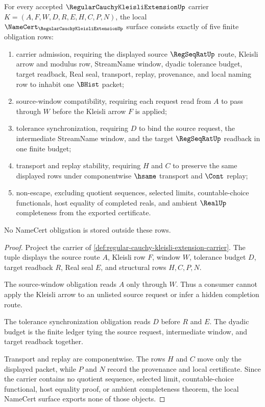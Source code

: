 \begin{theorem}
\label{thm:regular-cauchy-kleisli-extension-namecert-obligations}
For every accepted $\RegularCauchyKleisliExtensionUp$ carrier $K=(A,F,W,D,R,E,H,C,P,N)$, the local $\NameCert_{\RegularCauchyKleisliExtensionUp}$ surface consists exactly of five finite obligation rows:
\begin{enumerate}
\item carrier admission, requiring the displayed source $\RegSeqRatUp$ route, Kleisli arrow and modulus row, StreamName window, dyadic tolerance budget, target readback, Real seal, transport, replay, provenance, and local naming row to inhabit one $\BHist$ packet;
\item source-window compatibility, requiring each request read from $A$ to pass through $W$ before the Kleisli arrow $F$ is applied;
\item tolerance synchronization, requiring $D$ to bind the source request, the intermediate StreamName window, and the target $\RegSeqRatUp$ readback in one finite budget;
\item transport and replay stability, requiring $H$ and $C$ to preserve the same displayed rows under componentwise $\hsame$ transport and $\Cont$ replay;
\item non-escape, excluding quotient sequences, selected limits, countable-choice functionals, host equality of completed reals, and ambient $\RealUp$ completeness from the exported certificate.
\end{enumerate}
No NameCert obligation is stored outside these rows.
\end{theorem}
\begin{proof}
Project the carrier of \autoref{def:regular-cauchy-kleisli-extension-carrier}. The tuple displays the source route $A$, Kleisli row $F$, window $W$, tolerance budget $D$, target readback $R$, Real seal $E$, and structural rows $H,C,P,N$.

The source-window obligation reads $A$ only through $W$. Thus a consumer cannot apply the Kleisli arrow to an unlisted source request or infer a hidden completion route.

The tolerance synchronization obligation reads $D$ before $R$ and $E$. The dyadic budget is the finite ledger tying the source request, intermediate window, and target readback together.

Transport and replay are componentwise. The rows $H$ and $C$ move only the displayed packet, while $P$ and $N$ record the provenance and local certificate. Since the carrier contains no quotient sequence, selected limit, countable-choice functional, host equality proof, or ambient completeness theorem, the local NameCert surface exports none of those objects.
\end{proof}

